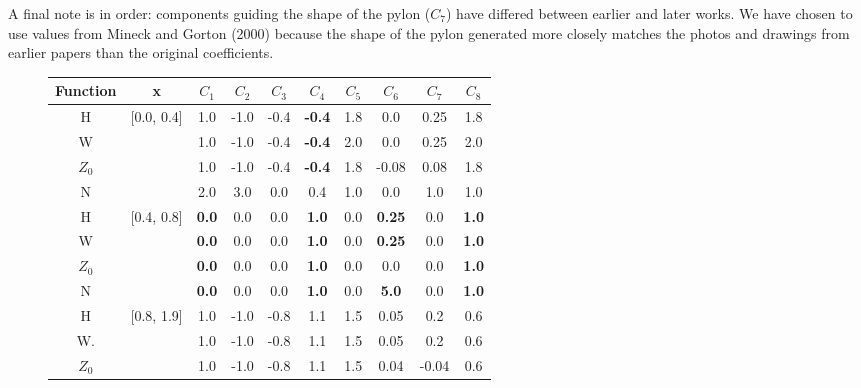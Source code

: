 \documentclass[12pt]{article}
\begin{document}
A final note is in order: components guiding the shape of the pylon ($C_{7}$) have differed
between earlier and later works. We have chosen to use values from Mineck and Gorton (2000)
\cite{mineckgorton} because the shape of the pylon generated more closely matches the photos
and drawings from earlier papers \cite{nasa80051,nasa87762} than the original coefficients.




\begin{figure}[ht]
\begin{centering}
\begin{small}
\begin{tabular}{cccccccccc}
Function & x & $C_{1}$ & $C_{2}$ & $C_{3}$ & $C_{4}$ & $C_{5}$ & $C_{6}$ & $C_{7}$ & $C_{8}$ \\
\hline
H          & [0.0, 0.4]  & 1.0 & -1.0 & -0.4 & \textbf{-0.4} & 1.8 & 0.0    & 0.25 & 1.8 \\
W          &                 & 1.0 & -1.0 & -0.4 & \textbf{-0.4} & 2.0 & 0.0    & 0.25 & 2.0 \\
$Z_{0}$ &                 & 1.0 & -1.0 & -0.4 & \textbf{-0.4} & 1.8 & -0.08 & 0.08 & 1.8 \\
N           &                 & 2.0 & 3.0  & 0.0  &              0.4  & 1.0 & 0.0    & 1.0   & 1.0 \\
\hline
H          & [0.4, 0.8]  & \textbf{0.0} & 0.0 & 0.0 & \textbf{1.0} & 0.0 & \textbf{0.25} & 0.0 & \textbf{1.0} \\
W          &                 & \textbf{0.0} & 0.0 & 0.0 & \textbf{1.0} & 0.0 & \textbf{0.25} & 0.0 & \textbf{1.0} \\
$Z_{0}$ &                 & \textbf{0.0} & 0.0 & 0.0 & \textbf{1.0} & 0.0 & 0.0               & 0.0 & \textbf{1.0} \\
N           &                 & \textbf{0.0} & 0.0 & 0.0 & \textbf{1.0} & 0.0 & \textbf{5.0}   & 0.0 & \textbf{1.0} \\
\hline
H          & [0.8, 1.9]  & 1.0 & -1.0 & -0.8 & 1.1 & 1.5 & 0.05 & 0.2             & 0.6 \\
W.         &                 & 1.0 & -1.0 & -0.8 & 1.1 & 1.5 & 0.05 & 0.2             & 0.6 \\
$Z_{0}$ &                 & 1.0 & -1.0 & -0.8 & 1.1 & 1.5 & 0.04 & -0.04        & 0.6 \\

\end{tabular}
\end{small}
\end{centering}
\end{figure}
\end{document}
